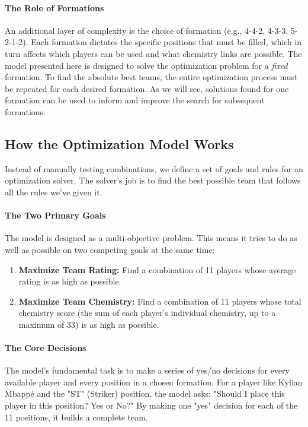 \documentclass{article}
\begin{document}
\paragraph{The Role of Formations} An additional layer of complexity is the choice of formation (e.g., 4-4-2, 4-3-3, 5-2-1-2). Each formation dictates the specific positions that must be filled, which in turn affects which players can be used and what chemistry links are possible. The model presented here is designed to solve the optimization problem for a \textit{fixed} formation. To find the absolute best teams, the entire optimization process must be repeated for each desired formation. As we will see, solutions found for one formation can be used to inform and improve the search for subsequent formations.

\subsection{How the Optimization Model Works}
Instead of manually testing combinations, we define a set of goals and rules for an optimization solver. The solver's job is to find the best possible team that follows all the rules we've given it.

\paragraph{The Two Primary Goals}
The model is designed as a multi-objective problem. This means it tries to do as well as possible on two competing goals at the same time:
\begin{enumerate}
    \item \textbf{Maximize Team Rating:} Find a combination of 11 players whose average rating is as high as possible.
    \item \textbf{Maximize Team Chemistry:} Find a combination of 11 players whose total chemistry score (the sum of each player's individual chemistry, up to a maximum of 33) is as high as possible.
\end{enumerate}

\paragraph{The Core Decisions}
The model's fundamental task is to make a series of yes/no decisions for every available player and every position in a chosen formation. For a player like Kylian Mbappé and the "ST" (Striker) position, the model asks: "Should I place this player in this position? Yes or No?" By making one "yes" decision for each of the 11 positions, it builds a complete team.
\end{document}
